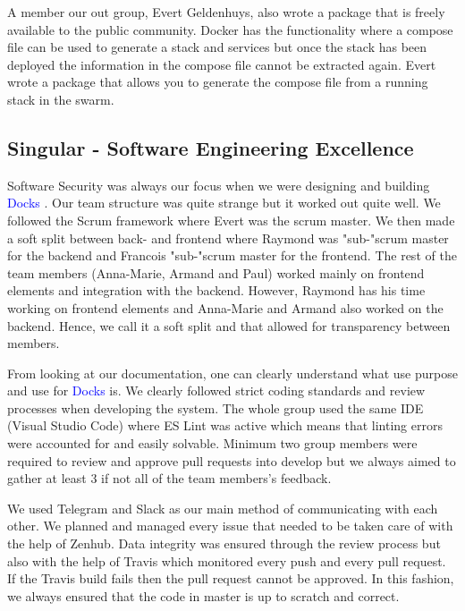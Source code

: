 \documentclass[]{article}
\newcommand{\docks}{\textcolor{Blue}{Docks} }
\newcommand{\docker}{Docker }
\begin{document}
A member our out group, Evert Geldenhuys, also wrote a package that is freely 
available to the public community. \docker has the functionality where a compose file
can be used to generate a stack and services but once the stack has been deployed the 
information in the compose file cannot be extracted again. Evert wrote a package that
allows you to generate the compose file from a running stack in the swarm.


\subsection{Singular - Software Engineering Excellence}
Software Security was always our focus when we were designing and building \docks.
Our team structure was quite strange but it worked out quite well. We followed the Scrum 
framework where Evert was the scrum master. We then made a soft split between back- 
and frontend where Raymond was "sub-"scrum master for the backend and Francois "sub-"scrum
master for the frontend. The rest of the team members (Anna-Marie, Armand and Paul) 
worked mainly on frontend elements and integration with the backend. However, Raymond 
has his time working on frontend elements and Anna-Marie and Armand also worked on the 
backend. Hence, we call it a soft split and that allowed for transparency between members. 

From looking at our documentation, one can clearly understand what use purpose and use 
for \docks is. We clearly followed strict coding standards and review processes when 
developing the system. The whole group used the same IDE (Visual Studio Code) where ES Lint 
was active which means that linting errors were accounted for and easily solvable. Minimum two 
group members were required to review and approve pull requests into develop but we always
aimed to gather at least 3 if not all of the team members's feedback.

We used Telegram and Slack as our main method of communicating with each other. We planned and
managed every issue that needed to be taken care of with the help of Zenhub. Data integrity was 
ensured through the review process but also with the help of Travis which monitored every push and
every pull request. If the Travis build fails then the pull request cannot be approved. In this fashion,
we always ensured that the code in master is up to scratch and correct.
\end{document}
